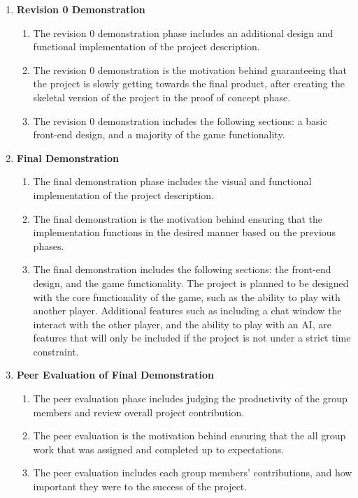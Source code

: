 \documentclass[]{article}
\begin{document}
\begin{enumerate}[ ]
	\item \textbf{Revision 0 Demonstration}
	    \begin{enumerate}[1.]
            \item The revision 0 demonstration phase includes an additional design and functional implementation of the project description.
	        \item The revision 0 demonstration is the motivation behind guaranteeing that the project is slowly getting towards the final product, after creating the skeletal version of the project in the proof of concept phase. 
	        \item The revision 0 demonstration includes the following sections: a basic front-end design, and a majority of the game functionality. 
	    \end{enumerate}	
	    
	\item \textbf{Final Demonstration}
	    \begin{enumerate}[1.]
            \item The final demonstration phase includes the visual and functional implementation of the project description.
	        \item The final demonstration is the motivation behind ensuring that the implementation functions in the desired manner based on the previous phases. 
	        \item The final demonstration includes the following sections: the front-end design, and the game functionality. The project is planned to be designed with the core functionality of the game, such as the ability to play with another player. Additional features such as including a chat window the interact with the other player, and the ability to play with an AI, are features that will only be included if the project is not under a strict time constraint.	    
	    \end{enumerate}
	
	\item \textbf{Peer Evaluation of Final Demonstration}
	    \begin{enumerate}[1.]
            \item The peer evaluation phase includes judging the productivity of the group members and review overall project contribution.
	        \item The peer evaluation is the motivation behind ensuring that the all group work that was assigned and completed up to expectations. 
	        \item The peer evaluation includes each group members' contributions, and how important they were to the success of the project.
	    \end{enumerate}	
	

\end{enumerate}
\end{document}
